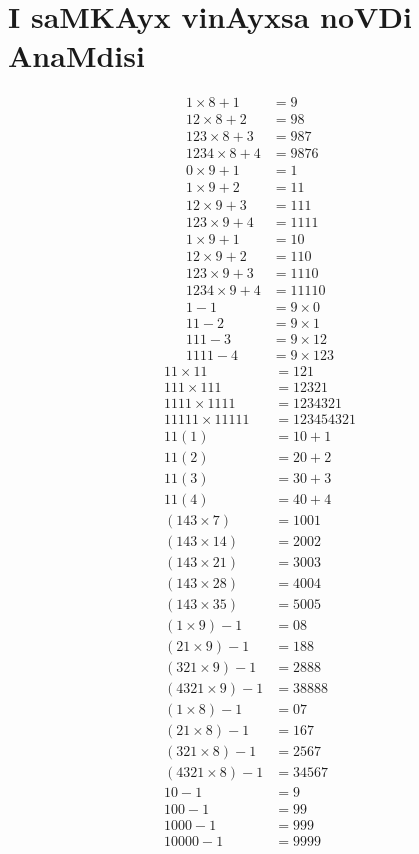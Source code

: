 \chapter{I saMKAyx vinAyxsa noVDi AnaMdisi}
\vskip -20pt

\begin{align*}
1\times 8 + 1 &= 9\\
12 \times 8 + 2 &= 98\\
123 \times 8 + 3 &= 987\\
1234 \times 8 + 4 &= 9876\\[0.3cm]
0\times 9+1 &= 1\\          %
1\times 9+ 2 &= 11\\
12 \times 9 + 3 &= 111\\
123 \times 9 + 4 &=1111\\[0.3cm]
1\times 9 +1 &= 10\\ %
12\times 9 +2 &= 110\\
123 \times 9 + 3 &= 1110\\
1234 \times 9 +4 &= 11110\\[0.3cm]
1-1 &= 9 \times 0\\ %
11-2 &= 9 \times 1 \\
111 - 3 &= 9 \times 12\\
1111-4 &= 9 \times 123
\end{align*}
\begin{align*}
11\times 11 &= 121 \\ %
111 \times 111 &= 12321\\
1111 \times 1111 &= 1234321 \\
11111 \times 11111 &= 123454321\\[0.3cm]
11(1) &= 10+1\\ %
11(2) &= 20+2\\
11(3) &= 30+3\\
11(4) &= 40+4\\[0.3cm]
(143\times 7) &= 1001\\ %
(143 \times 14)&=2002 \\
(143 \times 21) &=3003\\
(143 \times 28) &=4004\\
(143 \times 35) &=5005\\[0.3cm]
(1\times 9) - 1 &= 08\\ %
(21 \times 9) - 1 &= 188\\
(321 \times 9) - 1 &= 2888\\
(4321 \times 9)-1 &= 38888\\[0.3cm]
(1 \times 8) - 1 &= 07\\ %
(21\times 8) - 1 &= 167\\
(321 \times 8)-1 &= 2567\\
(4321 \times 8) -1 &=34567\\[0.3cm]
10-1 &= 9\\ %
100-1 &= 99\\
1000-1 &= 999\\
10000 - 1 &= 9999
\end{align*}
